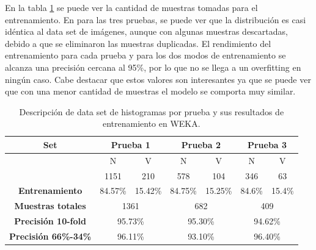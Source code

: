 \documentclass[twoside,spanish,ESP,MSc]{plantillaLabUPV}
\theoremstyle{definition}
\begin{document}
En la tabla \ref{imadatcol} se puede ver la cantidad de muestras tomadas para el entrenamiento. En para las tres pruebas, se puede ver que la distribución es casi idéntica al data set de imágenes, aunque con algunas muestras descartadas, debido a que se eliminaron las muestras duplicadas. El rendimiento del entrenamiento para cada prueba y para los dos modos de entrenamiento se alcanza una precisión cercana al 95\%, por lo que no se llega a un overfitting en ningún caso. Cabe destacar que estos valores son interesantes ya que se puede ver que con una menor cantidad de muestras el modelo se comporta muy similar.

\begin{table}[h]
	\caption{Descripción de data set de histogramas por prueba y sus resultados de entrenamiento en WEKA.}
	\label{imadatcol}
	\centering
	\begin{tabular}{|c|c|c|c|c|c|c|}
		\hline
		\textbf{Set}                             & \multicolumn{2}{c|}{\textbf{Prueba 1}}              & \multicolumn{2}{c|}{\textbf{Prueba 2}}              & \multicolumn{2}{c|}{\textbf{Prueba 3}}              \\ \hline
		& {\color[HTML]{F56B00} N} & {\color[HTML]{009901} V} & {\color[HTML]{F56B00} N} & {\color[HTML]{009901} V} & {\color[HTML]{F56B00} N} & {\color[HTML]{009901} V} \\ \cline{2-7} 
		& 1151                     & 210                      & 578                        & 104                        & 346                        & 63                        \\ \cline{2-7} 
		\multirow{-3}{*}{\textbf{Entrenamiento}} & 84.57\%                  & 15.42\%                  & 84.75\%                      & 15.25\%                      & 84.6\%                      & 15.4\%                      \\ \hline
		\textbf{Muestras totales}                & \multicolumn{2}{c|}{1361}                           & \multicolumn{2}{c|}{682}                              & \multicolumn{2}{c|}{409}                              \\ \hline
		\textbf{Precisión 10-fold}               & \multicolumn{2}{c|}{95.73\%}                        & \multicolumn{2}{c|}{95.30\%}                            & \multicolumn{2}{c|}{94.62\%}                            \\ \hline
		\textbf{Precisión 66\%-34\%}             & \multicolumn{2}{c|}{96.11\%}                        & \multicolumn{2}{c|}{93.10\%}                            & \multicolumn{2}{c|}{96.40\%}                            \\ \hline
	\end{tabular}
\end{table}
\end{document}
